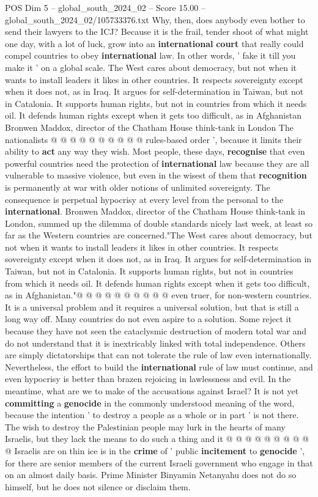 \begin{textsample}{POS Dim 5 – global\_south\_2024\_02 – Score 15.00 – global\_south\_2024\_02/105733376.txt}
Why, then, does anybody even bother to send their lawyers to the ICJ?
Because it is the frail, tender shoot of what might one day, with a lot of luck, grow into an \textbf{international} \textbf{court} that really could compel countries to obey \textbf{international} law.
In other words, ' fake it till you make it ' on a global scale.
The West cares about democracy, but not when it wants to install leaders it likes in other countries.
It respects sovereignty except when it does not, as in Iraq.
It argues for self-determination in Taiwan, but not in Catalonia.
It supports human rights, but not in countries from which it needs oil.
It defends human rights except when it gets too difficult, as in Afghanistan Bronwen Maddox, director of the Chatham House think-tank in London The nationalists @ @ @ @ @ @ @ @ @ @ rules-based order ', because it limits their ability to \textbf{act} any way they wish.
Most people, these days, \textbf{recognise} that even powerful countries need the protection of \textbf{international} law because they are all vulnerable to massive violence, but even in the wisest of them that \textbf{recognition} is permanently at war with older notions of unlimited sovereignty.
The consequence is perpetual hypocrisy at every level from the personal to the \textbf{international}.
Bronwen Maddox, director of the Chatham House think-tank in London, summed up the dilemma of double standards nicely last week, at least so far as the Western countries are concerned."The West cares about democracy, but not when it wants to install leaders it likes in other countries.
It respects sovereignty except when it does not, as in Iraq.
It argues for self-determination in Taiwan, but not in Catalonia.
It supports human rights, but not in countries from which it needs oil.
It defends human rights except when it gets too difficult, as in Afghanistan."@ @ @ @ @ @ @ @ @ @ even truer, for non-western countries.
It is a universal problem and it requires a universal solution, but that is still a long way off.
Many countries do not even aspire to a solution.
Some reject it because they have not seen the cataclysmic destruction of modern total war and do not understand that it is inextricably linked with total independence.
Others are simply dictatorships that can not tolerate the rule of law even internationally.
Nevertheless, the effort to build the \textbf{international} rule of law must continue, and even hypocrisy is better than brazen rejoicing in lawlessness and evil.
In the meantime, what are we to make of the accusations against Israel?
It is not yet \textbf{committing} a \textbf{genocide} in the commonly understood meaning of the word, because the intention ' to destroy a people as a whole or in part ' is not there.
The wish to destroy the Palestinian people may lurk in the hearts of many Israelis, but they lack the means to do such a thing and it @ @ @ @ @ @ @ @ @ @ Israelis are on thin ice is in the \textbf{crime} of ' public \textbf{incitement} to \textbf{genocide} ', for there are senior members of the current Israeli government who engage in that on an almost daily basis.
Prime Minister Binyamin Netanyahu does not do so himself, but he does not silence or disclaim them.


\end{textsample}
